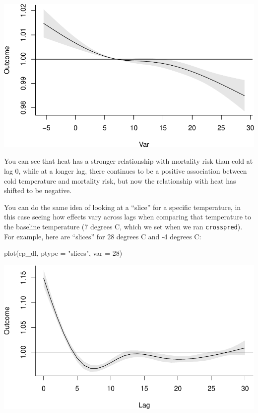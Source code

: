 \documentclass[
]{book}
\newenvironment{Shaded}{\begin{snugshade}}{\end{snugshade}}
\newcommand{\AttributeTok}[1]{\textcolor[rgb]{0.77,0.63,0.00}{#1}}
\newcommand{\DecValTok}[1]{\textcolor[rgb]{0.00,0.00,0.81}{#1}}
\newcommand{\FunctionTok}[1]{\textcolor[rgb]{0.00,0.00,0.00}{#1}}
\newcommand{\NormalTok}[1]{#1}
\newcommand{\StringTok}[1]{\textcolor[rgb]{0.31,0.60,0.02}{#1}}
\begin{document}
\includegraphics{adv_epi_analysis_files/figure-latex/unnamed-chunk-105-2.pdf}

You can see that heat has a stronger relationship with mortality risk than cold at lag 0,
while at a longer lag, there continues to be a positive association between cold temperature
and mortality risk, but now the relationship with heat has shifted to be negative.

You can do the same idea of looking at a ``slice'' for a specific temperature, in this case
seeing how effects vary across lags when comparing that temperature to the baseline temperature
(7 degrees C, which we set when we ran \texttt{crosspred}). For example, here are ``slices'' for
28 degrees C and -4 degrees C:

\begin{Shaded}
\begin{Highlighting}[]
\FunctionTok{plot}\NormalTok{(cp\_dl, }\AttributeTok{ptype =} \StringTok{"slices"}\NormalTok{, }\AttributeTok{var =} \DecValTok{28}\NormalTok{)}
\end{Highlighting}
\end{Shaded}

\includegraphics{adv_epi_analysis_files/figure-latex/unnamed-chunk-106-1.pdf}
\end{document}
